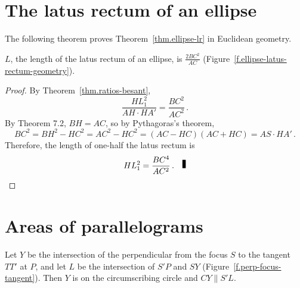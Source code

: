 
\section{The latus rectum of an ellipse}

The following theorem proves Theorem~\ref{thm.ellipse-lr} in Euclidean geometry.
\begin{theorem}[Prop.~V]\label{thm.ellipse-lr-besant}
$L$, the length of the latus rectum of an ellipse, is 
$\displaystyle\frac{2BC^2}{AC}$ (Figure~\ref{f.ellipse-latus-rectum-geometry}).
\end{theorem}
\begin{proof}
By Theorem~\ref{thm.ratios-besant},
\[
\frac{HL_1^2}{AH\cdot HA'}=\frac{BC^2}{AC^2}\,.
\]
By Theorem 7.2, $BH=AC$, so by Pythagoras's theorem,
\[
BC^2=BH^2-HC^2=AC^2-HC^2=(AC-HC)(AC+HC)=AS\cdot HA'\,.
\]
Therefore, the length of one-half the latus rectum is
\[
HL_1^2=\frac{BC^4}{AC^2}\,.\fqed
\]%
\end{proof}


\section{Areas of parallelograms}

\begin{theorem}[Prop. XI]\label{thm.perp-tangent}
Let $Y$ be the intersection of the perpendicular from the focus $S$ to the tangent $TT'$ at $P$, and let $L$ be the intersection of $S'P$ and $SY$ (Figure~\ref{f.perp-focus-tangent}). Then $Y$ is on the circumscribing circle and $CY\parallel S'L$.
\end{theorem}


